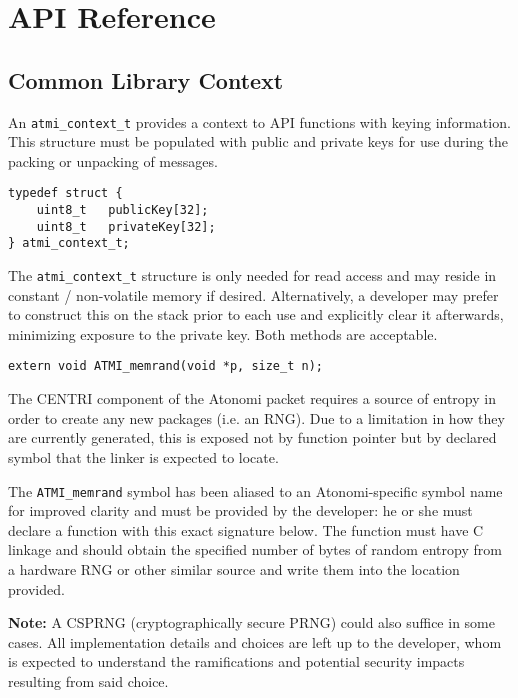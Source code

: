 \chapter{API Reference}

\section{Common Library Context}
An \texttt{atmi_context_t} provides a context to API functions with keying
information. This structure must be populated with public and private keys
for use during the packing or unpacking of messages.

\begin{lstlisting}[name=Context Structure]
typedef struct {
	uint8_t   publicKey[32];
	uint8_t   privateKey[32];
} atmi_context_t;
\end{lstlisting}

The \texttt{atmi_context_t} structure is only needed for read access and
may reside in constant / non-volatile memory if desired. Alternatively,
a developer may prefer to construct this on the stack prior to each use
and explicitly clear it afterwards, minimizing exposure to the private key.
Both methods are acceptable.

\begin{lstlisting}
extern void ATMI_memrand(void *p, size_t n);
\end{lstlisting}

The CENTRI component of the Atonomi packet requires a source of entropy
in order to create any new packages (i.e. an RNG). Due to a limitation in
how they are currently generated, this is exposed not by function pointer
but by declared symbol that the linker is expected to locate.

The \texttt{ATMI_memrand} symbol has been aliased to an Atonomi-specific
symbol name for improved clarity and must be provided by the developer:
he or she must declare a function with this exact signature below.
The function must have C linkage and should obtain the specified number of
bytes of random entropy from a hardware RNG or other similar source and write
them into the location provided.

\textbf{Note:} A CSPRNG (cryptographically secure PRNG) could also suffice
in some cases. All implementation details and choices are left up to the
developer, whom is expected to understand the ramifications and potential
security impacts resulting from said choice.


